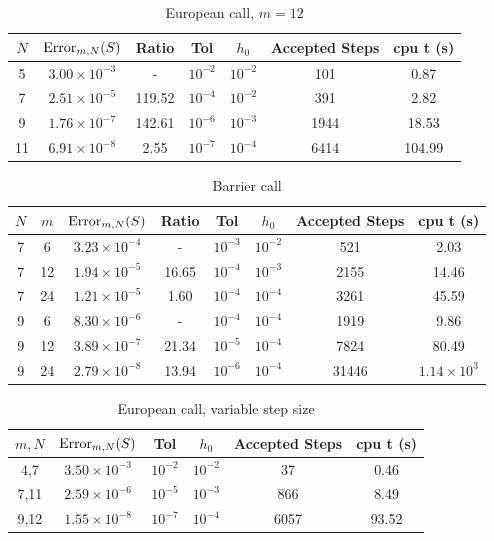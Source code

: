 \documentclass[a4paper,12pt]{article}
\begin{document}
 \begin{table}
 \caption{European call, $m = 12$}
 \begin{center}
 \begin{tabular}{||c c c c c c c||} 
 \hline
 $N$ & $\operatorname{Error}_{m,N}(S)$ & Ratio & Tol & $h_0$ & Accepted Steps & cpu t (s) \\ [0.5ex] 
 \hline\hline
 5 & $3.00 \times 10^{-3}$ & - & $10^{-2}$ & $10^{-2}$ & 101 & 0.87\\ 
 \hline
 7 & $2.51 \times 10^{-5}$ & 119.52 & $10^{-4}$ & $10^{-2}$ & 391 & 2.82\\
 \hline
 9 & $1.76 \times 10^{-7}$ & 142.61 & $10^{-6}$ & $10^{-3}$ & 1944 & 18.53 \\
 \hline
 11 & $6.91 \times 10^{-8}$ & 2.55 & $10^{-7}$ & $10^{-4}$ & 6414 & 104.99 \\
 \hline
\end{tabular}
\end{center}
\end{table}


 \begin{table}
 \caption{Barrier call}
 \begin{center}
 \begin{tabular}{||c c c c c c c c||} 
 \hline
 $N$ & $m$ & $\operatorname{Error}_{m,N}(S)$ & Ratio & Tol & $h_0$ & Accepted Steps & cpu t (s) \\ [0.5ex] 
 \hline\hline
 7 & 6 & $3.23 \times 10^{-4}$ & - & $10^{-3}$ & $10^{-2}$ & 521 & 2.03\\ 
 \hline
 7 & 12 & $1.94 \times 10^{-5}$ & 16.65 &$10^{-4}$ & $10^{-3}$ & 2155 & 14.46 \\
 \hline
 7 & 24 & $1.21 \times 10^{-5}$ & 1.60 &$10^{-4}$ & $10^{-4}$ & 3261 & 45.59 \\
 \hline
 9 & 6 & $8.30 \times 10^{-6}$ & - &$10^{-4}$ & $10^{-4}$ & 1919 & 9.86\\
 \hline
 9 & 12 & $3.89 \times 10^{-7}$ & 21.34 &$10^{-5}$ & $10^{-4}$ & 7824 & 80.49\\
\hline
 9 & 24 & $2.79 \times 10^{-8}$ & 13.94 &$10^{-6}$ & $10^{-4}$ & 31446 & $1.14 \times 10^{3}$\\
 \hline
\end{tabular}
\end{center}
\end{table}



 \begin{table}
 \caption{European call, variable step size}
\begin{center}
 \begin{tabular}{||c c c c c c||} 
 \hline
 $m, N$ & $\operatorname{Error}_{m,N}(S)$ & Tol & $h_0$ & Accepted Steps & cpu t (s) \\ [0.5ex] 
 \hline\hline
 4,7 &  $3.50 \times 10^{-3}$ & $10^{-2}$ & $10^{-2}$ & 37 & 0.46\\ 
 \hline
 7,11 & $2.59 \times 10^{-6}$ & $10^{-5}$ & $10^{-3}$ & 866 & 8.49 \\
 \hline
 9,12 & $1.55 \times 10^{-8}$ & $10^{-7}$ & $10^{-4}$ & 6057 & 93.52 \\
 \hline
\end{tabular}
\end{center}
\end{table}
\end{document}

